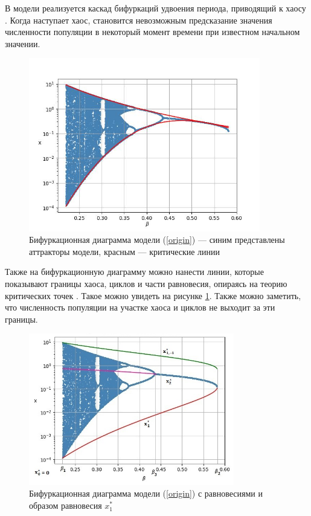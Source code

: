     В модели реализуется каскад бифуркаций удвоения периода, приводящий к хаосу \cite[стр. 33]{elementsOfNonlinearDynamic}. Когда наступает хаос, становится невозможным предсказание значения численности популяции в некоторый момент времени при известном начальном значении.
        
    \begin{figure}
        \centering
        \includegraphics[width=0.9\textwidth]{deterministic/images/bifurcation_chaos.jpg}

        \captionsetup{justification=centering}
        \caption{Бифуркационная диаграмма модели (\ref{origin}) --- синим представлены аттракторы модели, красным --- критические линии }
        \label{bifurcation_chaos}
    \end{figure}
        
    Также на бифуркационную диаграмму можно нанести линии, которые показывают границы хаоса, циклов и части равновесия, опираясь на теорию критических точек \cite{nonsmoothOneDimensionalMapsSomeBasicConceptsAndDefinitions}. Такое можно увидеть на рисунке \ref{bifurcation_chaos}. Также можно заметить, что численность популяции на участке хаоса и циклов не выходит за эти границы.
        
    \begin{figure}
        \centering
        \includegraphics[width=0.8\textwidth]{deterministic/images/bifurcation_attract.jpg}

        \captionsetup{justification=centering}
        \caption{Бифуркационная диаграмма модели (\ref{origin}) с равновесиями и образом равновесия \(x_1^*\) }
        \label{bifurcation_attractor}
    \end{figure}

